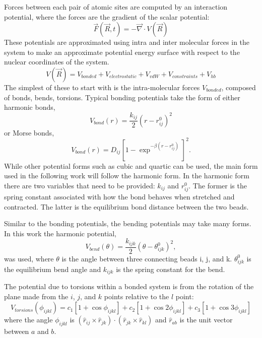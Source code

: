 Forces between each pair of atomic sites are computed by an interaction potential, where the forces are the gradient of the scalar potential:
\begin{equation}
\vec{F}(\vec{R},t) = -\vec{\nabla} \cdot V(\vec{R})
\end{equation}
These potentials are approximated using intra and inter molecular forces in the system to make an approximate potential energy surface with respect to the nuclear coordinates of the system.~\cite{Leach2001} 
\begin{equation}
   V(\vec{R}) = V_{bonded} + V_{electrostatic} + V_{vdW} + V_{constraints} + V_{hb}     
\end{equation}
The simplest of these to start with is the intra-molecular forces $V_{bonded}$, composed of bonds, bends, torsions. Typical bonding potentials take the form of either harmonic bonds,
\begin{equation}
    V_{bond}(r) = \frac{k_{ij}}{2} (r - r_{ij}^0)^2
\end{equation}
or Morse bonds,
\begin{equation}
    V_{bond}(r) = D_{ij} [1 - \exp^{-\beta (r - r_{ij}^0)}]^2 .
\end{equation}
While other potential forms such as cubic and quartic can be used, the main form used in the following work will follow the harmonic form. In the harmonic form there are two variables that need to be provided: $k_{ij}$ and $r_{ij}^0$. The former is the spring constant associated with how the bond behaves when stretched and contracted. The latter is the equilibrium bond distance between the two beads.

Similar to the bonding potentials, the bending potentials may take many forms. In this work the harmonic potential,
\begin{equation}
    V_{bend} (\theta) = \frac{k_{ijk}}{2} (\theta - \theta_{ijk}^0)^2,
\end{equation}
was used, where $\theta$ is the angle between three connecting beads i, j, and k. $\theta_{ijk}^0$ is the equilibrium bend angle and $k_{ijk}$ is the spring constant for the bend.

The potential due to torsions within a bonded system is from the rotation of the plane made from the $i$, $j$, and $k$ points relative to the $l$ point:
\begin{equation}
    V_{torsions} (\phi_{ijkl})= c_1 [1 + \cos{\phi_{ijkl}}] + c_2 [1 + \cos{2\phi_{ijkl}}] + c_3 [1 + \cos{3\phi_{ijkl}}]  
\end{equation}
where the angle $\phi_{ijkl}$ is $(\hat{r}_{ij} \times \hat{r}_{jk}) \cdot (\hat{r}_{jk} \times \hat{r}_{kl})$ and $\hat{r}_{ab}$ is the unit vector between $a$ and $b$.


